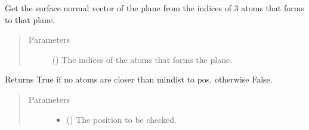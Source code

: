 \documentclass[letterpaper,10pt,english]{sphinxmanual}
\begin{document}
\begin{fulllineitems}
\begin{fulllineitems}
\begin{quote}
\begin{description}
\begin{itemize}
\end{itemize}

\end{description}\end{quote}

\end{fulllineitems}


\begin{fulllineitems}
\label{\detokenize{modules:acat.adsorption_sites.ClusterAdsorptionSites.get_surface_normal}}
Get the surface normal vector of the plane from the indices
of 3 atoms that forms to that plane.
\begin{quote}\begin{description}
\item[{Parameters}] \leavevmode
{} () \textendash{} The indices of the atoms that forms the plane.

\end{description}\end{quote}

\end{fulllineitems}


\begin{fulllineitems}
\label{\detokenize{modules:acat.adsorption_sites.ClusterAdsorptionSites.no_atom_too_close_to_pos}}
Returns True if no atoms are closer than mindist to pos,
otherwise False.
\begin{quote}\begin{description}
\item[{Parameters}] \leavevmode\begin{itemize}
\item {} 
 () \textendash{} The position to be checked.


\end{itemize}
\end{description}
\end{quote}
\end{fulllineitems}
\end{fulllineitems}
\end{document}
